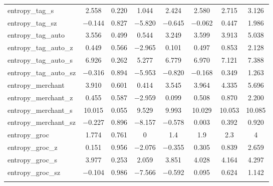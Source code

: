 \begin{table}[!htbp]
\begin{tabular}{@{\extracolsep{5pt}}lccccccc}
entropy\_tag\_s & 2.558 & 0.220 & 1.044 & 2.424 & 2.580 & 2.715 & 3.126 \\ 
entropy\_tag\_sz & $-$0.144 & 0.827 & $-$5.820 & $-$0.645 & $-$0.062 & 0.447 & 1.986 \\ 
entropy\_tag\_auto & 3.556 & 0.499 & 0.544 & 3.249 & 3.599 & 3.913 & 5.038 \\ 
entropy\_tag\_auto\_z & 0.449 & 0.566 & $-$2.965 & 0.101 & 0.497 & 0.853 & 2.128 \\ 
entropy\_tag\_auto\_s & 6.926 & 0.262 & 5.277 & 6.779 & 6.970 & 7.121 & 7.388 \\ 
entropy\_tag\_auto\_sz & $-$0.316 & 0.894 & $-$5.953 & $-$0.820 & $-$0.168 & 0.349 & 1.263 \\ 
entropy\_merchant & 3.910 & 0.601 & 0.414 & 3.545 & 3.964 & 4.335 & 5.696 \\ 
entropy\_merchant\_z & 0.455 & 0.587 & $-$2.959 & 0.099 & 0.508 & 0.870 & 2.200 \\ 
entropy\_merchant\_s & 10.015 & 0.055 & 9.529 & 9.993 & 10.029 & 10.053 & 10.085 \\ 
entropy\_merchant\_sz & $-$0.227 & 0.896 & $-$8.157 & $-$0.578 & 0.003 & 0.392 & 0.920 \\ 
entropy\_groc & 1.774 & 0.761 & 0 & 1.4 & 1.9 & 2.3 & 4 \\ 
entropy\_groc\_z & 0.151 & 0.956 & $-$2.076 & $-$0.355 & 0.305 & 0.839 & 2.659 \\ 
entropy\_groc\_s & 3.977 & 0.253 & 2.059 & 3.851 & 4.028 & 4.164 & 4.297 \\ 
entropy\_groc\_sz & $-$0.104 & 0.986 & $-$7.566 & $-$0.592 & 0.095 & 0.624 & 1.142 \\ 
\hline \\[-1.8ex] 
\end{tabular} 
\end{table} 

